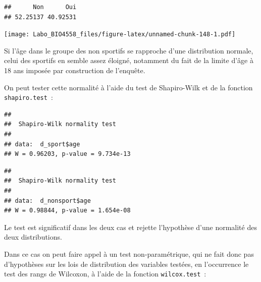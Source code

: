 \documentclass[
  12pt,
]{book}
\newenvironment{Shaded}{\begin{snugshade}}{\end{snugshade}}
\newcommand{\KeywordTok}[1]{\textcolor[rgb]{0.13,0.29,0.53}{\textbf{#1}}}
\newcommand{\NormalTok}[1]{#1}
\newcommand{\OperatorTok}[1]{\textcolor[rgb]{0.81,0.36,0.00}{\textbf{#1}}}
\begin{document}
\begin{verbatim}
##      Non      Oui 
## 52.25137 40.92531
\end{verbatim}

\begin{Shaded}
\end{Shaded}

\texttt{[image: Labo\_BIO4558\_files/figure-latex/unnamed-chunk-148-1.pdf]}

Si l'âge dans le groupe des non sportifs se rapproche d'une distribution normale, celui des sportifs en semble assez éloigné, notamment du fait de la limite d'âge à 18 ans imposée par construction de l'enquête.

On peut tester cette normalité à l'aide du test de Shapiro-Wilk et de la fonction \texttt{shapiro.test}~:

\begin{Shaded}
\end{Shaded}

\begin{verbatim}
## 
##  Shapiro-Wilk normality test
## 
## data:  d_sport$age
## W = 0.96203, p-value = 9.734e-13
\end{verbatim}

\begin{Shaded}
\end{Shaded}

\begin{verbatim}
## 
##  Shapiro-Wilk normality test
## 
## data:  d_nonsport$age
## W = 0.98844, p-value = 1.654e-08
\end{verbatim}

Le test est significatif dans les deux cas et rejette l'hypothèse d'une normalité des deux distributions.

Dans ce cas on peut faire appel à un test non-paramétrique, qui ne fait donc pas d'hypothèses sur les lois de distribution des variables testées, en l'occurrence le test des rangs de Wilcoxon, à l'aide de la fonction \texttt{wilcox.test}~:
\end{document}
